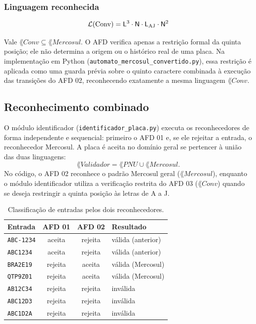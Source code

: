 \subsubsection{Linguagem reconhecida}

\[
  \mathcal{L}(\mathrm{Conv}) = \mathsf{L}^3 \cdot \mathsf{N} \cdot \mathsf{L}_{\mathrm{AJ}} \cdot \mathsf{N}^2
\]

Vale $\lang{Conv} \subseteq \lang{Mercosul}$. O AFD verifica apenas a
restrição formal da quinta posição; ele não determina a origem ou o
histórico real de uma placa. Na implementação em Python
(\texttt{automato\_mercosul\_convertido.py}), essa restrição é
aplicada como uma guarda prévia sobre o quinto caractere combinada
à execução das transições do AFD 02, reconhecendo exatamente a mesma
linguagem $\lang{Conv}$.

\subsection{Reconhecimento combinado}

O módulo identificador (\texttt{identificador\_placa.py}) executa os
reconhecedores de forma independente e sequencial: primeiro o AFD 01 e,
se ele rejeitar a entrada, o reconhecedor Mercosul. A placa é aceita
no domínio geral se pertencer à união das duas linguagens:
\[
  \lang{Validador} = \lang{PNU} \cup \lang{Mercosul}.
\]
No código, o AFD 02 reconhece o padrão Mercosul geral ($\lang{Mercosul}$),
enquanto o módulo identificador utiliza a verificação restrita do AFD 03
($\lang{Conv}$) quando se deseja restringir a quinta posição às letras
de A a J.

\begin{table}[ht]
\centering
\begin{tabular}{lccl}
\toprule
Entrada & AFD 01 & AFD 02 & Resultado \\
\midrule
\texttt{ABC-1234} & aceita  & rejeita & válida (anterior) \\
\texttt{ABC1234}  & aceita  & rejeita & válida (anterior) \\
\texttt{BRA2E19}  & rejeita & aceita  & válida (Mercosul) \\
\texttt{QTP9Z01}  & rejeita & aceita  & válida (Mercosul) \\
\texttt{AB12C34}  & rejeita & rejeita & inválida \\
\texttt{ABC12D3}  & rejeita & rejeita & inválida \\
\texttt{ABC1D2A}  & rejeita & rejeita & inválida \\
\bottomrule
\end{tabular}
\caption{Classificação de entradas pelos dois reconhecedores.}
\label{tab:classificacao}
\end{table}